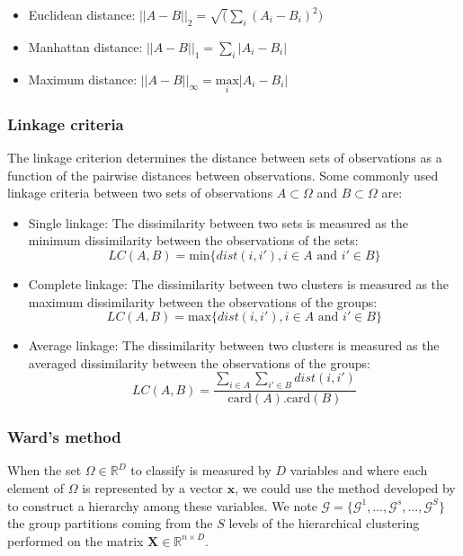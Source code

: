 \documentclass[]{book}
\begin{document}
\begin{itemize}
\item
  Euclidean distance: \(||A - B||_2 = \sqrt(\sum_i(A_i - B_i)^2)\)
\item
  Manhattan distance: \(||A - B||_1 = \sum_i |A_i - B_i|\)
\item
  Maximum distance:
  \(||A - B||_{\infty} = \underset{i}{\text{max}} |A_i - B_i|\)
\end{itemize}

\hypertarget{linkage-criteria}{%
\subsubsection*{Linkage criteria}\label{linkage-criteria}}

The linkage criterion determines the distance between sets of
observations as a function of the pairwise distances between
observations. Some commonly used linkage criteria between two sets of
observations \(A \subset \Omega\) and \(B \subset \Omega\) are:

\begin{itemize}
\item
  Single linkage: The dissimilarity between two sets is measured as
  the minimum dissimilarity between the observations of the sets:
  \[LC(A,B) = \text{min} \lbrace dist(i,i'), i \in A \text{ and } i' \in B \rbrace\]
\item
  Complete linkage: The dissimilarity between two clusters is measured
  as the maximum dissimilarity between the observations of the groups:
  \[LC(A,B) = \text{max} \lbrace dist(i,i'), i \in A \text{ and } i' \in B \rbrace\]
\item
  Average linkage: The dissimilarity between two clusters is measured
  as the averaged dissimilarity between the observations of the
  groups:
  \[LC(A,B) = \frac{\sum_{i \in A}\sum_{i'\in B} dist(i,i')}{\text{card}(A).\text{card}(B)}\]
\end{itemize}

\hypertarget{wards-method}{%
\subsubsection*{Ward's method}\label{wards-method}}

When the set \(\Omega \in \mathbb{R}^D\) to classify is measured by \(D\) variables
and where each element of \(\Omega\) is represented by a vector \(\boldsymbol{x}\), we
could use the method developed by \citep{ward_hierarchical_1963} to construct
a hierarchy among these variables. We note
\(\mathcal{G} = \lbrace \mathcal{G}^1, \dots, \mathcal{G}^s, \dots, \mathcal{G}^S \rbrace\)
the group partitions coming from the \(S\) levels of the hierarchical
clustering performed on the matrix \(\mathbf{X} \in \mathbb{R}^{n \times D}\).
\end{document}
